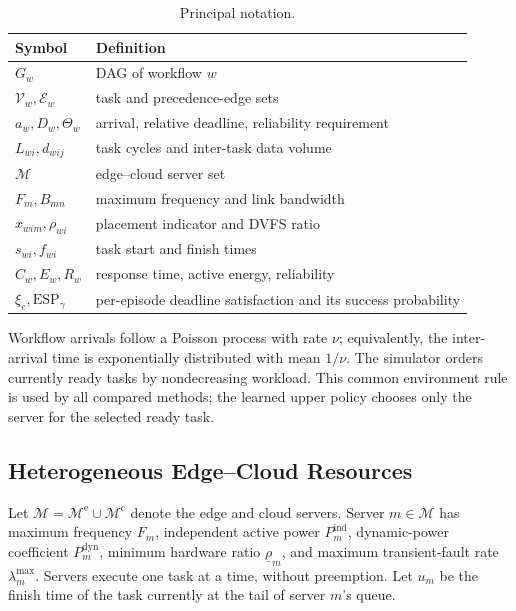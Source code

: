 \documentclass[lettersize,journal]{IEEEtran}
\begin{document}
\begin{table}[t]
\centering
\caption{Principal notation.}
\label{tab:notation}
\renewcommand{\arraystretch}{1.08}
\begin{tabular}{@{}p{}p{}@{}}
\toprule
Symbol & Definition \\
\midrule
$G_w$ & DAG of workflow $w$ \\
$\mathcal{V}_w,\mathcal{E}_w$ & task and precedence-edge sets \\
$a_w,D_w,\Theta_w$ & arrival, relative deadline, reliability requirement \\
$L_{wi},d_{wij}$ & task cycles and inter-task data volume \\
$\mathcal{M}$ & edge--cloud server set \\
$F_m,B_{mn}$ & maximum frequency and link bandwidth \\
$x_{wim},\rho_{wi}$ & placement indicator and DVFS ratio \\
$s_{wi},f_{wi}$ & task start and finish times \\
$C_w,E_w,R_w$ & response time, active energy, reliability \\
$\xi_e,\mathrm{ESP}_{\gamma}$ & per-episode deadline satisfaction and its success probability \\
\bottomrule
\end{tabular}
\end{table}

Workflow arrivals follow a Poisson process with rate $\nu$; equivalently, the
inter-arrival time is exponentially distributed with mean $1/\nu$. The simulator
orders currently ready tasks by nondecreasing workload. This common environment
rule is used by all compared methods; the learned upper policy chooses only the
server for the selected ready task.

\subsection{Heterogeneous Edge--Cloud Resources}
Let $\mathcal{M}=\mathcal{M}^{\mathrm e}\cup\mathcal{M}^{\mathrm c}$ denote the
edge and cloud servers. Server $m\in\mathcal{M}$ has maximum frequency $F_m$,
independent active power $P_m^{\mathrm{ind}}$, dynamic-power coefficient
$P_m^{\mathrm{dyn}}$, minimum hardware ratio $\underline\rho_m$, and maximum
transient-fault rate $\lambda_m^{\max}$. Servers execute one task at a time,
without preemption. Let $u_m$ be the finish time of the task currently at the
tail of server $m$'s queue.
\end{document}
